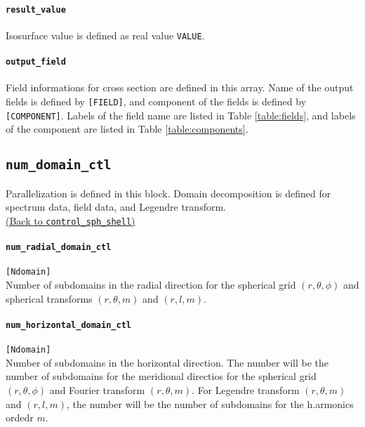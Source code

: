 %
\paragraph{\tt result\_value}
\label{href_t:result_value}
Isosurface value is defined as real value \verb|VALUE|.

%
\paragraph{\tt output\_field}
\label{href_t:iso_output_field}
Field informations for cross section are defined in this array. Name of the output fields is defined by \verb|[FIELD]|, and component of the fields is defined by \verb|[COMPONENT]|. Labels of the field name are listed in Table \ref{table:fields}, and labels of the component are listed in Table \ref{table:components}. \\
%

%
%
%
%
\subsection{\tt num\_domain\_ctl}
\label{href_t:num_domain_ctl}
Parallelization is defined in this block. Domain decomposition is defined for spectrum data, field data, and Legendre transform. \\
\hyperref[href_i:num_domain_ctl]{(Back to {\tt control\_sph\_shell})}

\paragraph{\tt num\_radial\_domain\_ctl}
\label{href_t:num_radial_domain_ctl}
\verb|[Ndomain]| \\
Number of subdomains in the radial direction for the spherical grid $(r, \theta, \phi)$ and spherical transforms $(r, \theta, m)$ and $(r, l, m)$.

\paragraph{\tt num\_horizontal\_domain\_ctl}
\label{href_t:num_horizontal_domain_ctl} 
\verb|[Ndomain]| \\
Number of subdomains in the horizontal direction. The number will be the number of subdomains for the meridional directios for the spherical grid $(r, \theta, \phi)$ and Fourier transform $(r, \theta, m)$. For Legendre transform $(r, \theta, m)$ and $(r, l, m)$, the number will be the number of subdomains for the h.armonics ordedr $m$.


